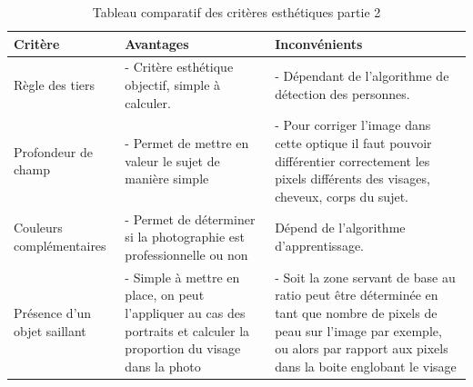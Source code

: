 \documentclass[11pt, french]{report-rd-info}
\begin{document}
\begin{table}
\begin{center}
\begin{tabular}{|p{3cm}|p{6cm}|p{7cm}|}
\hline
\textbf{Critère} & \textbf{Avantages} & \textbf{Inconvénients} \\ \hline
Règle des tiers & - Critère esthétique objectif, simple à calculer. & - Dépendant de l'algorithme de détection des personnes. \\ \hline
Profondeur de champ & - Permet de mettre en valeur le sujet de manière simple & - Pour corriger l'image dans cette optique il faut pouvoir différentier correctement les pixels différents des visages, cheveux, corps du sujet. \\ \hline
Couleurs complémentaires & - Permet de déterminer si la photographie est professionnelle ou non & Dépend de l’algorithme d'apprentissage. \\ \hline
Présence d'un objet saillant & - Simple à mettre en place, on peut l'appliquer au cas des portraits et calculer la proportion du visage dans la photo & - Soit la zone servant de base au ratio peut être déterminée en tant que nombre de pixels de peau sur l'image par exemple, ou alors par rapport aux pixels dans la boite englobant le visage \\ \hline
\end{tabular}
\end{center}
\caption{Tableau comparatif des critères esthétiques partie 2}
\label{tab:ComparaisonCriteres2}
\end{table}
\end{document}
